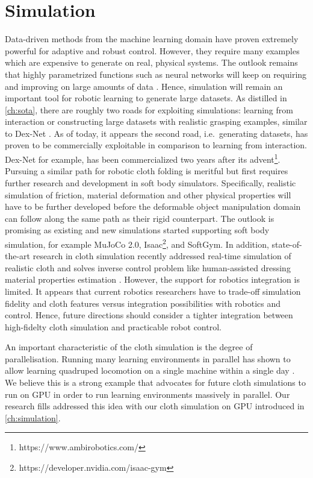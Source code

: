 \documentclass[\home/main.tex]{subfiles}
\begin{document}
\section{Simulation}
Data-driven methods from the machine learning domain have proven extremely powerful for adaptive and robust control. However, they require many examples which are expensive to generate on real, physical systems. The outlook remains that highly parametrized functions such as neural networks will keep on requiring and improving on large amounts of data \autocite{sun2017revisiting}. Hence, simulation will remain an important tool for robotic learning to generate large datasets. As distilled in \cref{ch:sota}, there are roughly two roads for exploiting simulations: learning from interaction or constructing large datasets with realistic grasping examples, similar to Dex-Net \autocite{dexnet}. As of today, it appears the second road, i.e.\ generating datasets, has proven to be commercially exploitable in comparison to learning from interaction. Dex-Net for example, has been commercialized two years after its advent\footnote{https://www.ambirobotics.com/}. Pursuing a similar path for robotic cloth folding is meritful but first requires further research and development in soft body simulators. Specifically,
realistic simulation of friction, material deformation and other physical properties will have to be further developed before the deformable object manipulation domain can follow along the same path as their rigid counterpart. The outlook is promising as  existing and new simulations started supporting soft body simulation, for example MuJoCo 2.0, Isaac\footnote{https://developer.nvidia.com/isaac-gym}, and SoftGym. In addition, state-of-the-art research in cloth simulation recently addressed real-time simulation of realistic cloth and solves inverse control problem like human-assisted dressing material properties estimation \autocite{Junbang2019,li2021diffcloth}. However, the support for robotics integration is limited. It appears that current robotics researchers have to trade-off simulation fidelity and cloth features versus integration possibilities with robotics and control. Hence, future directions should consider a tighter integration between high-fidelty cloth simulation and practicable robot control.

An important characteristic of the cloth simulation is the degree of parallelisation. Running many learning environments in parallel has shown to allow learning quadruped locomotion on a single machine within a single day \autocite{rudin2021learning}. We believe this is a strong example that advocates for future cloth simulations to run on GPU in order to run learning environments massively in parallel. Our research fills addressed this idea with our cloth simulation on \gls{GPU} introduced in \cref{ch:simulation}.    
\end{document}
